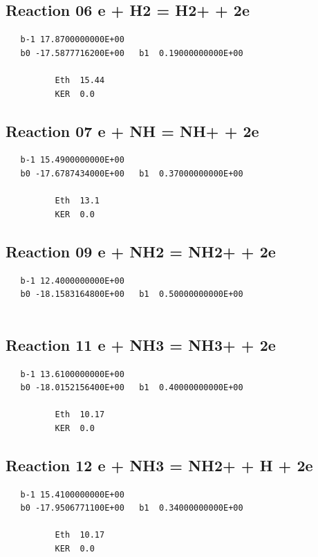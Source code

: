 \documentclass[12pt]{article}
\begin{document}
\subsection{
Reaction 06 e + H2 = H2+ + 2e }
\begin{small}\begin{verbatim}
   b-1 17.8700000000E+00
   b0 -17.5877716200E+00   b1  0.19000000000E+00

          Eth  15.44
          KER  0.0

\end{verbatim}\end{small}
\newpage

\subsection{
Reaction 07 e + NH = NH+ + 2e }
\begin{small}\begin{verbatim}
   b-1 15.4900000000E+00
   b0 -17.6787434000E+00   b1  0.37000000000E+00

          Eth  13.1
          KER  0.0

\end{verbatim}\end{small}
\newpage

\subsection{
Reaction 09 e + NH2 = NH2+ + 2e }
\begin{small}\begin{verbatim}
   b-1 12.4000000000E+00
   b0 -18.1583164800E+00   b1  0.50000000000E+00


\end{verbatim}\end{small}
\newpage

\subsection{
Reaction 11 e + NH3 = NH3+ + 2e }
\begin{small}\begin{verbatim}
   b-1 13.6100000000E+00
   b0 -18.0152156400E+00   b1  0.40000000000E+00

          Eth  10.17
          KER  0.0

\end{verbatim}\end{small}
\newpage

\subsection{
Reaction 12 e + NH3 = NH2+ + H + 2e }
\begin{small}\begin{verbatim}
   b-1 15.4100000000E+00
   b0 -17.9506771100E+00   b1  0.34000000000E+00

          Eth  10.17
          KER  0.0

\end{verbatim}\end{small}
\newpage
\end{document}
